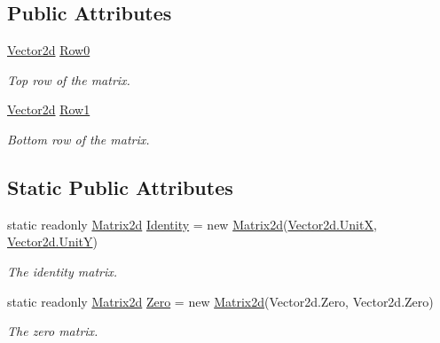 \subsection*{Public Attributes}
\begin{DoxyCompactItemize}
\item 
\hyperlink{struct_open_t_k_1_1_vector2d}{Vector2d} \hyperlink{struct_open_t_k_1_1_matrix2d_a49b4bbe9f2777d5cf0936d572c6c3ede}{Row0}
\begin{DoxyCompactList}\small\item\em Top row of the matrix. \end{DoxyCompactList}\item 
\hyperlink{struct_open_t_k_1_1_vector2d}{Vector2d} \hyperlink{struct_open_t_k_1_1_matrix2d_a95e4daf2860fcb733a5789f59e9e6219}{Row1}
\begin{DoxyCompactList}\small\item\em Bottom row of the matrix. \end{DoxyCompactList}\end{DoxyCompactItemize}
\subsection*{Static Public Attributes}
\begin{DoxyCompactItemize}
\item 
static readonly \hyperlink{struct_open_t_k_1_1_matrix2d}{Matrix2d} \hyperlink{struct_open_t_k_1_1_matrix2d_a5b441b75ae3699e101f1693fec1452eb}{Identity} = new \hyperlink{struct_open_t_k_1_1_matrix2d}{Matrix2d}(\hyperlink{struct_open_t_k_1_1_vector2d_aef5769e047c770dcc537be20baf7fdab}{Vector2d.\-Unit\-X}, \hyperlink{struct_open_t_k_1_1_vector2d_a3bcd3b007dba58a896c0016ae27c21d2}{Vector2d.\-Unit\-Y})
\begin{DoxyCompactList}\small\item\em The identity matrix. \end{DoxyCompactList}\item 
static readonly \hyperlink{struct_open_t_k_1_1_matrix2d}{Matrix2d} \hyperlink{struct_open_t_k_1_1_matrix2d_abf0d56b0756f09a523e82c033247865c}{Zero} = new \hyperlink{struct_open_t_k_1_1_matrix2d}{Matrix2d}(Vector2d.\-Zero, Vector2d.\-Zero)
\begin{DoxyCompactList}\small\item\em The zero matrix. \end{DoxyCompactList}\end{DoxyCompactItemize}

